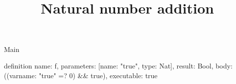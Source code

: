 \begin{lexlean}{Main}
\title{Natural number addition}
\begin{semanticmodule}
definition{
  name: f,
  parameters: [{name: "true", type: Nat}],
  result: Bool,
  body: ((var{name: "true"} =? 0) && true),
  executable: true
}
\end{semanticmodule}
\end{lexlean}
